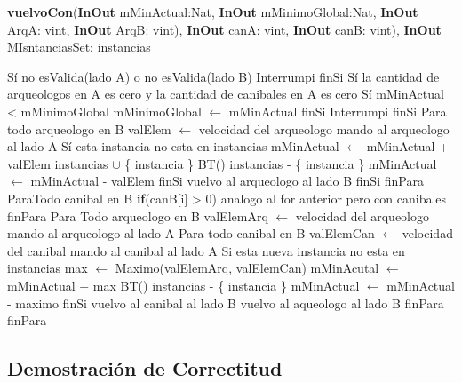 \documentclass[spanish,12pt]{article}
\begin{document}
\begin{algorithm}[H]{\textbf{vuelvoCon}(\textbf{InOut} mMinActual:Nat, \textbf{InOut} mMinimoGlobal:Nat, \textbf{InOut} ArqA: vint, \textbf{InOut} ArqB: vint), \textbf{InOut} canA: vint, \textbf{InOut} canB: vint), \textbf{InOut} MIsntanciasSet: instancias}
	\begin{algorithmic}
	\State Sí no esValida(lado A) o no esValida(lado B)	
	\State \quad Interrumpi
	\State finSi
	\State Sí la cantidad de arqueologos en A es cero y la cantidad de canibales en A es cero
	\State \quad Sí mMinActual < mMinimoGlobal
	\State \qquad mMinimoGlobal $\gets$ mMinActual
	\State \quad finSi
	\State  \quad Interrumpi
	\State finSi
	\State Para todo arqueologo en B 
	\State \qquad valElem $\gets$ velocidad del arqueologo
	\State \qquad mando al arqueologo al lado A	
	\State \qquad Sí esta instancia no esta en instancias
	\State \qquad \quad mMinActual $\gets$ mMinActual + valElem
	\State \qquad \quad instancias $\cup$ \{ instancia \}
	\State \qquad \quad BT()
	\State \qquad \quad instancias - \{ instancia \}
	\State \qquad \quad mMinActual $\gets$ mMinActual - valElem
	\State \qquad finSi
	\State \qquad vuelvo al arqueologo al lado B
	\State \quad finSi
	\State finPara
	\State ParaTodo canibal en B
	\State \quad \textbf{if}(canB[i] > 0)
	\State \qquad analogo al for anterior pero con canibales
	\State finPara
	\State Para Todo arqueologo en B 
	\State \quad valElemArq $\gets$ velocidad del arqueologo 
	\State \qquad mando al arqueologo al lado A
	\State \qquad Para todo canibal en B
	\State \qquad \quad valElemCan $\gets$ velocidad del canibal	
	\State \qquad \qquad mando al canibal al lado A
	\State \qquad \qquad Si esta nueva instancia no esta en instancias
	\State \qquad \qquad \quad max $\gets$ Maximo(valElemArq, valElemCan)
	\State \qquad \qquad \quad mMinAcutal $\gets$ mMinActual + max
	\State \qquad \qquad \quad BT()
	\State \qquad \qquad \quad instancias - \{ instancia \}
	\State \qquad \qquad \quad mMinActual $\gets$ mMinActual - maximo
	\State \qquad \qquad finSi
	\State \qquad \qquad vuelvo al canibal al lado B
	\State \qquad vuelvo al aqueologo al lado B 
	\State \qquad finPara
	\State finPara
																		
	\end{algorithmic}
\end{algorithm}


\subsection{Demostración de Correctitud}
\end{document}
